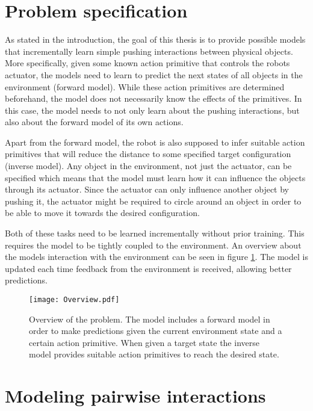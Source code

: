 \section{Problem specification \label{sec:problem}}

As stated in the introduction, the goal of this thesis is to provide possible models that incrementally learn simple pushing interactions between physical objects. 
More specifically, given some known action primitive that controls the robots actuator, the models need to learn to predict the next states of all objects in the environment (forward model). 
While these action primitives are determined beforehand, the model does not necessarily know the effects of the primitives. In this case, the model needs to not only learn about the pushing interactions, but also about the forward model of its own actions.

Apart from the forward model, the robot is also supposed to infer suitable action primitives that will reduce the distance to some specified target configuration (inverse model). Any object in the environment, not just the actuator, can be specified which means that the model must learn how it can influence the objects through its actuator. Since the actuator can only influence another object by pushing it, the actuator might be required to circle around an object in order to be able to move it towards the desired configuration. 

Both of these tasks need to be learned incrementally without prior training. This requires the model to be tightly coupled to the environment. An overview about the models interaction with the environment can be seen in figure \ref{fig:overview}. The model is updated each time feedback from the environment is received, allowing better predictions.


\begin{figure}
	\centering
	\texttt{[image: Overview.pdf]}
	\caption{Overview of the problem. The model includes a forward model in order to make predictions given the current environment state and a certain action primitive. When given a target state the inverse model provides suitable action primitives to reach the desired state.}
	\label{fig:overview}
\end{figure}

\section{Modeling pairwise interactions \label{sec:pairInt}}


